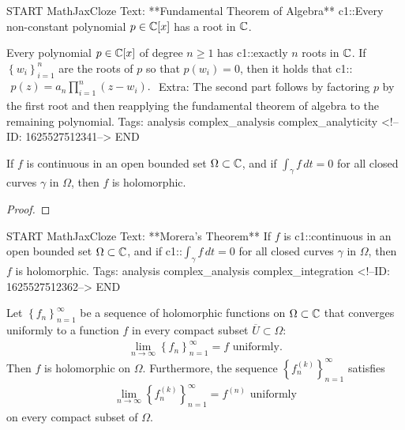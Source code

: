\documentclass{memoir}
\begin{document}
\begin{anki}
START
MathJaxCloze
Text: **Fundamental Theorem of Algebra**
{{c1::Every non-constant polynomial \(p \in \mathbb{C}[x]\) has a root in \(\mathbb{C}\).}} 

Every polynomial \(p \in \mathbb{C}[x]\) of degree \(n\geq 1\) has {{c1::exactly \(n\)}}  roots in \(\mathbb{C}\). If \(\left\{ w_i \right\}_{i=1}^{n}\) are the roots of \(p\) so that \(p(w_i) = 0\), then it holds that
 {{c1::\(\begin{align*}
         	p(z) = a_n \prod_{i=1}^{n} (z-w_i).
         \end{align*}\)}}
Extra: The second part follows by factoring \(p\) by the first root and then reapplying the fundamental theorem of algebra to the remaining polynomial.
Tags: analysis complex_analysis complex_analyticity
<!--ID: 1625527512341-->
END
\end{anki}


\begin{cor}
	If \(f\) is continuous in an open bounded set \(\Omega \subset \mathbb{C}\), and if \(\int_\gamma f \,d t = 0\) for all closed curves \(\gamma \) in \(\Omega \), then \(f\) is holomorphic.
\end{cor}
\begin{proof}
	
\end{proof}

\begin{anki}
START
MathJaxCloze
Text: **Morera's Theorem**
If \(f\) is {{c1::continuous}} in an open bounded set \(\Omega \subset \mathbb{C}\), and if {{c1::\(\int_\gamma f \,d t = 0\)}} for all closed curves \(\gamma \) in \(\Omega \), then \(f\) is holomorphic.
Tags: analysis complex_analysis complex_integration
<!--ID: 1625527512362-->
END
\end{anki}


\begin{thm}
	Let \(\left\{ f_n \right\}_{n=1}^{\infty}\) be a sequence of holomorphic functions on \(\Omega \subset \mathbb{C}\) that converges uniformly to a function \(f\) in every compact subset \(\overline{U}\subset \Omega \):
	\begin{align*}
		\lim_{n \to \infty} \left\{ f_n \right\}_{n=1}^{\infty} = f \text{ uniformly}.
	\end{align*}
	Then \(f\) is holomorphic on \(\Omega \). Furthermore, the sequence \(\left\{ f^{(k)}_n \right\}_{n=1}^{\infty}\) satisfies
	\begin{align*}
		\lim_{n \to \infty} \left\{ f^{(k)}_n\right\}_{n=1}^{\infty} = f^{(n)} \text{ uniformly} 
	\end{align*}
	on every compact subset of \(\Omega \).
\end{thm}
\end{document}
